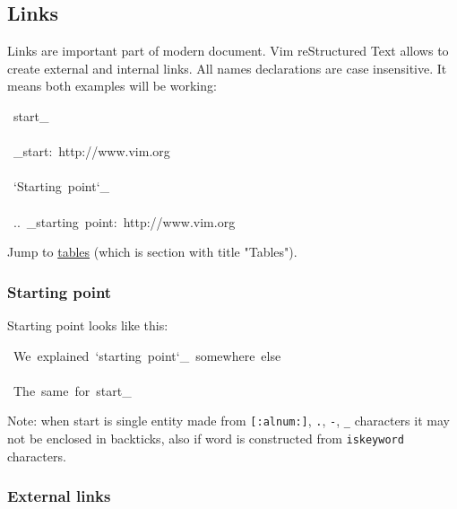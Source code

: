 \documentclass[12pt]{article}
\begin{document}
\hypertarget{llinks}{}
\subsection{Links}

Links are important part of modern document. Vim reStructured Text allows to create
external and internal links. All names declarations are case
insensitive. It means both examples will be working:

\begin{ttfamily}\begin{flushleft}
\mbox{~start\_}\\
\mbox{}\\
\mbox{~\_start:~http://www.vim.org}\\
\mbox{}\\
\mbox{~`Starting~point`\_}\\
\mbox{}\\
\mbox{~..~\_starting~point:~http://www.vim.org}\\
\end{flushleft}\end{ttfamily}

Jump to \href{\#ltables}{tables} (which is section with title "Tables").

\hypertarget{lstarting-point}{}
\subsubsection{Starting point}

Starting point looks like this:

\begin{ttfamily}\begin{flushleft}
\mbox{~We~explained~`starting~point`\_~somewhere~else}\\
\mbox{}\\
\mbox{~The~same~for~start\_}\\
\end{flushleft}\end{ttfamily}

Note: when start is single entity made from \texttt{[:alnum:]}, \texttt{.}, \texttt{-},
\texttt{\_} characters it may not be enclosed in backticks, also if word
is constructed from \texttt{iskeyword} characters.

\hypertarget{lexternal-links}{}
\subsubsection{External links}
\end{document}
